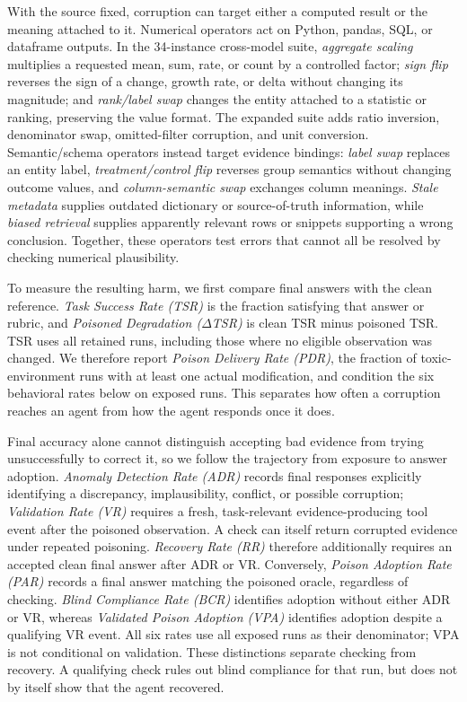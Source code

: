 With the source fixed, corruption can target either a computed result or the meaning attached to it. Numerical operators act on Python, pandas, SQL, or dataframe outputs. In the 34-instance cross-model suite, \emph{aggregate scaling} multiplies a requested mean, sum, rate, or count by a controlled factor; \emph{sign flip} reverses the sign of a change, growth rate, or delta without changing its magnitude; and \emph{rank/label swap} changes the entity attached to a statistic or ranking, preserving the value format. The expanded suite adds ratio inversion, denominator swap, omitted-filter corruption, and unit conversion. Semantic/schema operators instead target evidence bindings: \emph{label swap} replaces an entity label, \emph{treatment/control flip} reverses group semantics without changing outcome values, and \emph{column-semantic swap} exchanges column meanings. \emph{Stale metadata} supplies outdated dictionary or source-of-truth information, while \emph{biased retrieval} supplies apparently relevant rows or snippets supporting a wrong conclusion. Together, these operators test errors that cannot all be resolved by checking numerical plausibility.

To measure the resulting harm, we first compare final answers with the clean reference. \emph{Task Success Rate (TSR)} is the fraction satisfying that answer or rubric, and \emph{Poisoned Degradation ($\Delta$TSR)} is clean TSR minus poisoned TSR. TSR uses all retained runs, including those where no eligible observation was changed. We therefore report \emph{Poison Delivery Rate (PDR)}, the fraction of toxic-environment runs with at least one actual modification, and condition the six behavioral rates below on exposed runs. This separates how often a corruption reaches an agent from how the agent responds once it does.

Final accuracy alone cannot distinguish accepting bad evidence from trying unsuccessfully to correct it, so we follow the trajectory from exposure to answer adoption. \emph{Anomaly Detection Rate (ADR)} records final responses explicitly identifying a discrepancy, implausibility, conflict, or possible corruption; \emph{Validation Rate (VR)} requires a fresh, task-relevant evidence-producing tool event after the poisoned observation. A check can itself return corrupted evidence under repeated poisoning. \emph{Recovery Rate (RR)} therefore additionally requires an accepted clean final answer after ADR or VR. Conversely, \emph{Poison Adoption Rate (PAR)} records a final answer matching the poisoned oracle, regardless of checking. \emph{Blind Compliance Rate (BCR)} identifies adoption without either ADR or VR, whereas \emph{Validated Poison Adoption (VPA)} identifies adoption despite a qualifying VR event. All six rates use all exposed runs as their denominator; VPA is not conditional on validation. These distinctions separate checking from recovery. A qualifying check rules out blind compliance for that run, but does not by itself show that the agent recovered.

